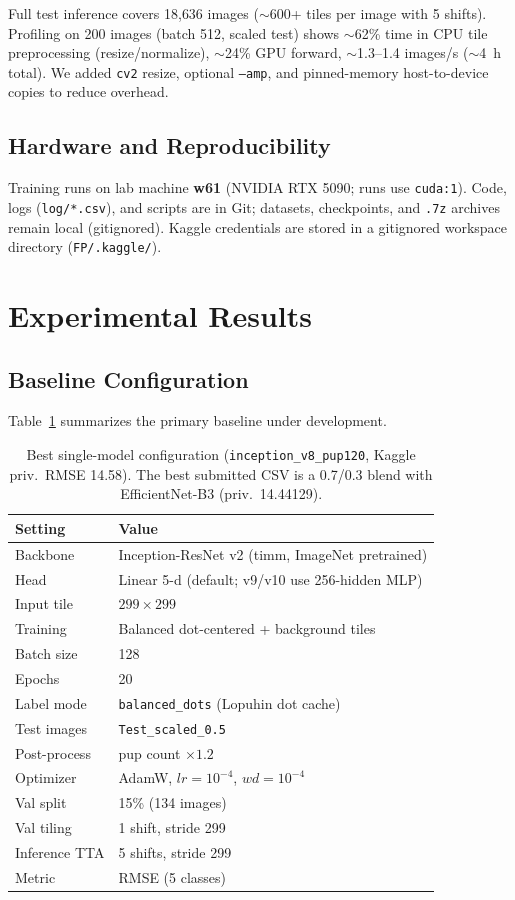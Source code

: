 \documentclass[12pt, a4paper]{article}
\begin{document}
Full test inference covers 18{,}636 images ($\sim$600+ tiles per image with 5 shifts). Profiling on 200 images (batch 512, scaled test) shows $\sim$62\% time in CPU tile preprocessing (resize/normalize), $\sim$24\% GPU forward, $\sim$1.3--1.4 images/s ($\sim$4~h total). We added \texttt{cv2} resize, optional \texttt{--amp}, and pinned-memory host-to-device copies to reduce overhead.

\subsection{Hardware and Reproducibility}
Training runs on lab machine \textbf{w61} (NVIDIA RTX 5090; runs use \texttt{cuda:1}). Code, logs (\texttt{log/*.csv}), and scripts are in Git; datasets, checkpoints, and \texttt{.7z} archives remain local (gitignored). Kaggle credentials are stored in a gitignored workspace directory (\texttt{FP/.kaggle/}).

\section{Experimental Results}
\label{sec:results}

\subsection{Baseline Configuration}
Table~\ref{tab:config} summarizes the primary baseline under development.

\begin{table}[htbp]
\centering
\caption{Best single-model configuration (\texttt{inception\_v8\_pup120}, Kaggle priv.\ RMSE 14.58). The best submitted CSV is a 0.7/0.3 blend with EfficientNet-B3 (priv.\ 14.44129).}
\label{tab:config}
\begin{tabular}{@{}ll@{}}
\toprule
\textbf{Setting} & \textbf{Value} \\ \midrule
Backbone & Inception-ResNet v2 (timm, ImageNet pretrained) \\
Head & Linear 5-d (default; v9/v10 use 256-hidden MLP) \\
Input tile & $299 \times 299$ \\
Training & Balanced dot-centered + background tiles \\
Batch size & 128 \\
Epochs & 20 \\
Label mode & \texttt{balanced\_dots} (Lopuhin dot cache) \\
Test images & \texttt{Test\_scaled\_0.5} \\
Post-process & pup count $\times 1.2$ \\
Optimizer & AdamW, $lr=10^{-4}$, $wd=10^{-4}$ \\
Val split & 15\% (134 images) \\
Val tiling & 1 shift, stride 299 \\
Inference TTA & 5 shifts, stride 299 \\
Metric & RMSE (5 classes) \\ \bottomrule
\end{tabular}
\end{table}
\end{document}
